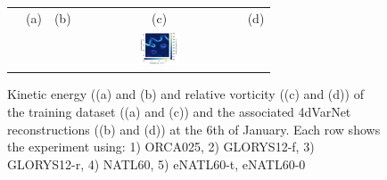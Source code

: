 \begin{figure}[h!]
\begin{center}
\begin{tabular}{ccccc}
 \hspace{-15mm} &(a) & (b) & (c) & (d) \\
 &&
&\hspace{-30mm} \includegraphics[trim={8mm 0 22mm 7cm},clip,width=4.5cm,height=1cm]{figures/plots/horizontal_cbar_ke_bottom.png} &\\

\end{tabular}
\vspace{-3mm}
\caption{
Kinetic energy ((a) and (b) and relative vorticity ((c) and (d)) of the training dataset ((a) and (c)) and the associated 4dVarNet reconstructions ((b) and (d)) at the 6th of January.
Each row shows the experiment using: 1) ORCA025, 2) GLORYS12-f, 3) GLORYS12-r, 4) NATL60, 5) eNATL60-t, eNATL60-0}
\vspace{-5mm}
\label{fig:maps}
\end{center}
\end{figure}